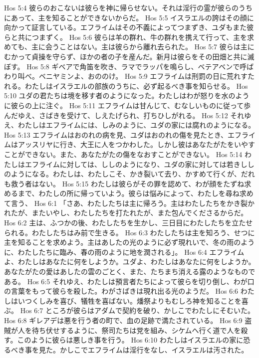 Hos 5:4  彼らのおこないは彼らを神に帰らせない。それは淫行の霊が彼らのうちにあって、主を知ることができないからだ。
Hos 5:5  イスラエルの誇はその顔に向かって証言している。エフライムはその不義によってつまずき、ユダもまた彼らと共につまずく。
Hos 5:6  彼らは羊の群れ、牛の群れを携えて行って、主を求めても、主に会うことはない。主は彼らから離れ去られた。
Hos 5:7  彼らは主にむかって貞操を守らず、ほかの者の子を産んだ。新月は彼らをその田畑と共に滅ぼす。
Hos 5:8  ギベアで角笛を吹き、ラマでラッパを鳴らし、ベテアベンで呼ばわり叫べ。ベニヤミンよ、おののけ。
Hos 5:9  エフライムは刑罰の日に荒れすたれる。わたしはイスラエルの部族のうちに、必ず起るべき事を知らせる。
Hos 5:10  ユダの君たちは境を移す者のようになった。わたしはわが怒りを水のように彼らの上に注ぐ。
Hos 5:11  エフライムは甘んじて、むなしいものに従って歩んだゆえ、さばきを受けて、しえたげられ、打ちひしがれる。
Hos 5:12  それゆえ、わたしはエフライムには、しみのように、ユダの家には腐れのようになる。
Hos 5:13  エフライムはおのれの病を見、ユダはおのれの傷を見たとき、エフライムはアッスリヤに行き、大王に人をつかわした。しかし彼はあなたがたをいやすことができない。また、あなたがたの傷をなおすことができない。
Hos 5:14  わたしはエフライムに対しては、ししのようになり、ユダの家に対しては若きししのようになる。わたしは、わたしこそ、かき裂いて去り、かすめて行くが、だれも救う者はない。
Hos 5:15  わたしは彼らがその罪を認めて、わが顔をたずね求めるまで、わたしの所に帰っていよう。彼らは悩みによって、わたしを尋ね求めて言う、
Hos 6:1  「さあ、わたしたちは主に帰ろう。主はわたしたちをかき裂かれたが、またいやし、わたしたちを打たれたが、また包んでくださるからだ。
Hos 6:2  主は、ふつかの後、わたしたちを生かし、三日目にわたしたちを立たせられる。わたしたちはみ前で生きる。
Hos 6:3  わたしたちは主を知ろう、せつに主を知ることを求めよう。主はあしたの光のように必ず現れいで、冬の雨のように、わたしたちに臨み、春の雨のように地を潤される」。
Hos 6:4  エフライムよ、わたしはあなたに何をしようか。ユダよ、わたしはあなたに何をしようか。あなたがたの愛はあしたの雲のごとく、また、たちまち消える露のようなものである。
Hos 6:5  それゆえ、わたしは預言者たちによって彼らを切り倒し、わが口の言葉をもって彼らを殺した。わがさばきは現れ出る光のようだ。
Hos 6:6  わたしはいつくしみを喜び、犠牲を喜ばない。燔祭よりもむしろ神を知ることを喜ぶ。
Hos 6:7  ところが彼らはアダムで契約を破り、かしこでわたしにそむいた。
Hos 6:8  ギレアデは悪を行う者の町で、血の足跡で満たされている。
Hos 6:9  盗賊が人を待ち伏せするように、祭司たちは党を組み、シケムへ行く道で人を殺す。このように彼らは悪しき事を行う。
Hos 6:10  わたしはイスラエルの家に恐るべき事を見た。かしこでエフライムは淫行をなし、イスラエルは汚された。
